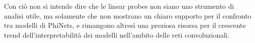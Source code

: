 Con ciò non si intende dire che le linear probes non siano uno strumento di analisi utile, ma solamente che non mostrano un chiaro supporto per il confronto tra modelli di PhiNets, e rimangono altresì una preziosa risorsa per il crescente trend dell'interpretabilità dei modelli nell'ambito delle reti convoluzionali.

